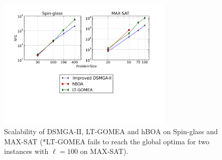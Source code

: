 \documentclass{sig-alternate-05-2015}
\begin{document}
\begin{figure}
\centering
\includegraphics[width=3.3in]{spin_satResults}
\caption{Scalability of DSMGA-II, LT-GOMEA and hBOA on Spin-glass and MAX-SAT (*LT-GOMEA fails to reach the global optima for two instances with $\ell=100$ on MAX-SAT).}
\end{figure}


%

%
%
\end{document}
